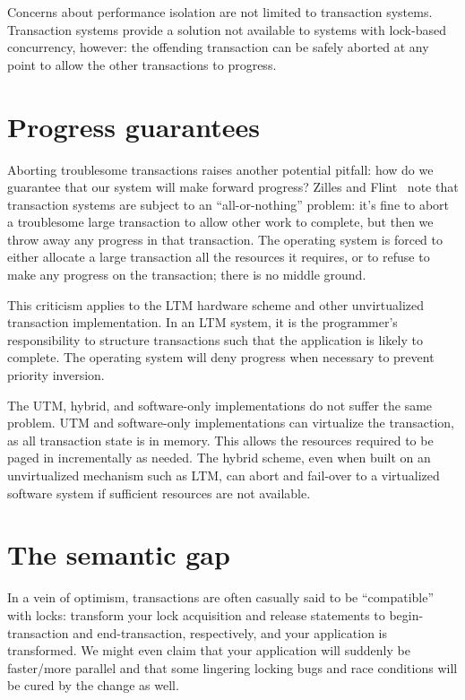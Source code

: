 Concerns about performance isolation are not limited to transaction
systems.  Transaction systems provide a solution not available to
systems with lock-based concurrency, however: the offending
transaction can be safely aborted at any point to allow the other
transactions to progress.

\section{Progress guarantees}\label{sec:progress}
Aborting troublesome transactions raises another potential pitfall:
how do we guarantee that our system will make forward progress?
Zilles and Flint~\cite{ZillesFl05} note that transaction systems are
subject to an ``all-or-nothing'' problem: it's fine to abort a
troublesome large transaction to allow other work to complete, but
then we throw away any progress in that transaction.  The operating
system is forced to either allocate a large transaction all the
resources it requires, or to refuse to make any progress on the
transaction; there is no middle ground.

This criticism applies to the LTM hardware scheme and other
unvirtualized transaction implementation.  In an LTM system, it is the
programmer's responsibility to structure transactions such that the
application is likely to complete.  The operating system will deny
progress when necessary to prevent priority inversion.

The UTM, hybrid, and software-only implementations do not suffer the
same problem.  UTM and software-only implementations can virtualize
the transaction, as all transaction state is in memory.  This allows
the resources required to be paged in incrementally as
needed.  The hybrid scheme, even when built on an unvirtualized
mechanism such as LTM, can abort and fail-over to a virtualized
software system if sufficient resources are not available.

\section{The semantic gap}\label{sec:semantic}
In a vein of optimism, transactions are often casually said to be
``compatible'' with locks: transform your lock acquisition and release
statements to begin-transaction and end-transaction, respectively, and
your application is transformed.  We might even claim that your
application will suddenly be faster/more parallel and that some
lingering locking bugs and race conditions will be cured by the change
as well.

